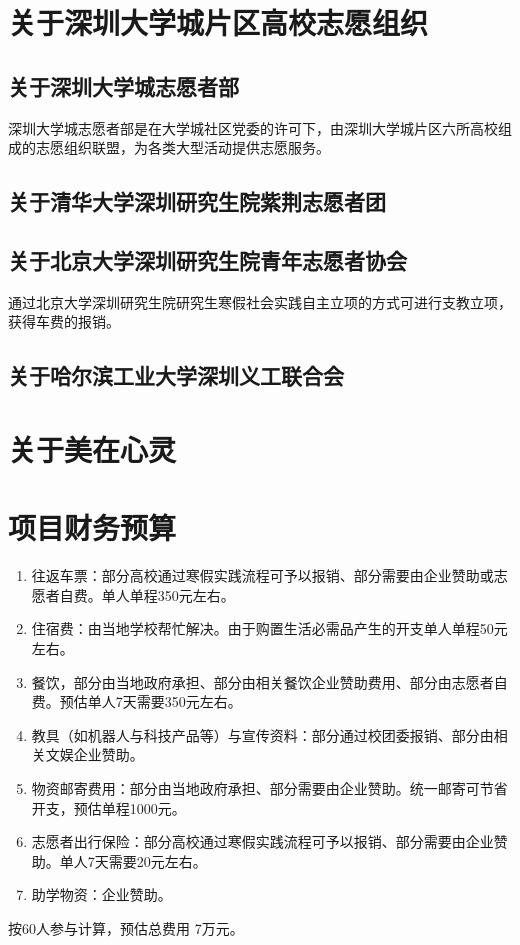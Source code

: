\documentclass[12pt]{ctexart}
\begin{document}
\begin{appendix}

\section{关于深圳大学城片区高校志愿组织}
\subsection{关于深圳大学城志愿者部}
深圳大学城志愿者部是在大学城社区党委的许可下，由深圳大学城片区六所高校组成的志愿组织联盟，为各类大型活动提供志愿服务。
\subsection{关于清华大学深圳研究生院紫荆志愿者团}

\subsection{关于北京大学深圳研究生院青年志愿者协会}
通过北京大学深圳研究生院研究生寒假社会实践自主立项的方式可进行支教立项，获得车费的报销。
\subsection{关于哈尔滨工业大学深圳义工联合会}

\section{关于美在心灵}

\section{项目财务预算}\label{scheduling}


\begin{enumerate}
\item 往返车票：部分高校通过寒假实践流程可予以报销、部分需要由企业赞助或志愿者自费。单人单程350元左右。
\item 住宿费：由当地学校帮忙解决。由于购置生活必需品产生的开支单人单程50元左右。
\item 餐饮，部分由当地政府承担、部分由相关餐饮企业赞助费用、部分由志愿者自费。预估单人7天需要350元左右。
\item 教具（如机器人与科技产品等）与宣传资料：部分通过校团委报销、部分由相关文娱企业赞助。
\item 物资邮寄费用：部分由当地政府承担、部分需要由企业赞助。统一邮寄可节省开支，预估单程1000元。
\item 志愿者出行保险：部分高校通过寒假实践流程可予以报销、部分需要由企业赞助。单人7天需要20元左右。
\item 助学物资：企业赞助。
\end{enumerate}
按60人参与计算，预估总费用 7万元。

\end{appendix}
\end{document}
